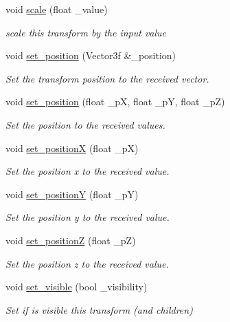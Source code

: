 \begin{DoxyCompactItemize}
void \mbox{\hyperlink{classbanita_1_1_transform___component_a83cc2d972d98fdcff1be55f9f5448df3}{scale}} (float \+\_\+value)
\begin{DoxyCompactList}\small\item\em scale this transform by the input value \end{DoxyCompactList}\item 
void \mbox{\hyperlink{classbanita_1_1_transform___component_ae7a4af52065190f0a49a78b8f33da4b1}{set\+\_\+position}} (Vector3f \&\+\_\+position)
\begin{DoxyCompactList}\small\item\em Set the transform position to the received vector. \end{DoxyCompactList}\item 
void \mbox{\hyperlink{classbanita_1_1_transform___component_a8f3783520cfdd86e531cecb1170af193}{set\+\_\+position}} (float \+\_\+pX, float \+\_\+pY, float \+\_\+pZ)
\begin{DoxyCompactList}\small\item\em Set the position to the received values. \end{DoxyCompactList}\item 
void \mbox{\hyperlink{classbanita_1_1_transform___component_a131ef7c654696489df92c39b1135dd90}{set\+\_\+positionX}} (float \+\_\+pX)
\begin{DoxyCompactList}\small\item\em Set the position x to the received value. \end{DoxyCompactList}\item 
void \mbox{\hyperlink{classbanita_1_1_transform___component_ae151b9b33e2afaaa9b8ecfedfa2d9a48}{set\+\_\+positionY}} (float \+\_\+pY)
\begin{DoxyCompactList}\small\item\em Set the position y to the received value. \end{DoxyCompactList}\item 
void \mbox{\hyperlink{classbanita_1_1_transform___component_a530739c068f5fcf6ed58118761b93e03}{set\+\_\+positionZ}} (float \+\_\+pZ)
\begin{DoxyCompactList}\small\item\em Set the position z to the received value. \end{DoxyCompactList}\item 
void \mbox{\hyperlink{classbanita_1_1_transform___component_afef6c54fd67345ad97b1deb948a4d9e1}{set\+\_\+visible}} (bool \+\_\+visibility)
\begin{DoxyCompactList}\small\item\em Set if is visible this transform (and children) \end{DoxyCompactList}\item 

\end{DoxyCompactItemize}
